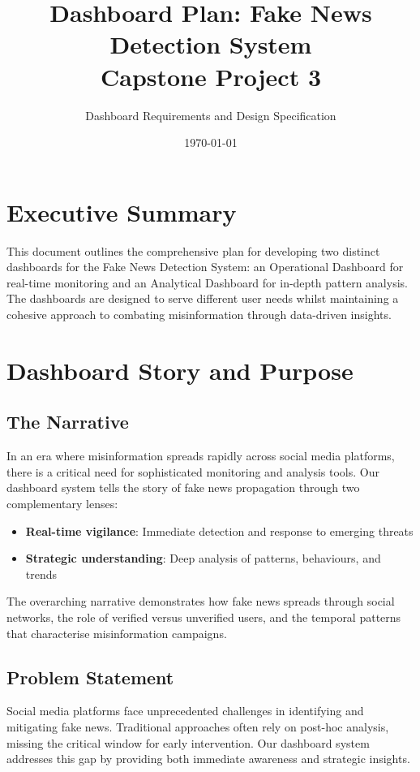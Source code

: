 \documentclass[11pt,a4paper]{article}
\title{\textbf{Dashboard Plan: Fake News Detection System\\Capstone Project 3}}
\author{Dashboard Requirements and Design Specification}
\date{\today}
\begin{document}
\maketitle

\section{Executive Summary}

This document outlines the comprehensive plan for developing two distinct dashboards for the Fake News Detection System: an Operational Dashboard for real-time monitoring and an Analytical Dashboard for in-depth pattern analysis. The dashboards are designed to serve different user needs whilst maintaining a cohesive approach to combating misinformation through data-driven insights.

\section{Dashboard Story and Purpose}

\subsection{The Narrative}
In an era where misinformation spreads rapidly across social media platforms, there is a critical need for sophisticated monitoring and analysis tools. Our dashboard system tells the story of fake news propagation through two complementary lenses:

\begin{itemize}
    \item \textbf{Real-time vigilance}: Immediate detection and response to emerging threats
    \item \textbf{Strategic understanding}: Deep analysis of patterns, behaviours, and trends
\end{itemize}

The overarching narrative demonstrates how fake news spreads through social networks, the role of verified versus unverified users, and the temporal patterns that characterise misinformation campaigns.

\subsection{Problem Statement}
Social media platforms face unprecedented challenges in identifying and mitigating fake news. Traditional approaches often rely on post-hoc analysis, missing the critical window for early intervention. Our dashboard system addresses this gap by providing both immediate awareness and strategic insights.
\end{document}
